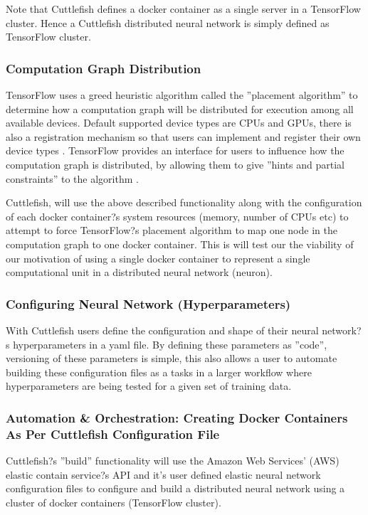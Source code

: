 \documentclass[conference]{IEEEtran}
\begin{document}
Note that Cuttlefish defines a docker container as a single server in a TensorFlow cluster. Hence a Cuttlefish distributed neural network is simply defined as TensorFlow cluster.

\subsubsection{Computation Graph Distribution}
TensorFlow uses a greed heuristic algorithm called the ''placement algorithm'' \cite{tensor-flow-white} to determine how a computation graph will be distributed for execution among all available devices. Default supported device types are CPUs and GPUs, there is  also a registration mechanism so that users can implement and register their own device types \cite{tensor-flow-white}. TensorFlow provides an interface for users to influence how the computation graph is distributed, by allowing them to give ''hints and partial constraints'' to the algorithm \cite{tensor-flow-white}. 

Cuttlefish, will use the above described functionality along with the configuration of each docker container?s system resources (memory, number of CPUs etc) to attempt to force TensorFlow?s placement algorithm to map one node in the computation graph to one docker container.  This is will test our the viability of our motivation of using a single docker container to represent a single computational unit in a distributed neural network (neuron).

\subsubsection{Configuring Neural Network (Hyperparameters)}
With Cuttlefish users define the configuration and shape of their neural network?s hyperparameters in a yaml file. By defining these parameters as ''code'', versioning of these parameters is simple, this also allows a user to automate building these configuration files as a tasks in a larger workflow where hyperparameters are being tested for a given set of training data.

\subsubsection{Automation \& Orchestration: Creating Docker Containers As Per Cuttlefish Configuration File}
Cuttlefish?s ''build'' functionality will use the Amazon Web Services' (AWS) elastic contain service?s API \cite{ecs-api} and it's user defined elastic neural network configuration files to configure and build a distributed neural network using a cluster of docker containers (TensorFlow cluster).
\end{document}
